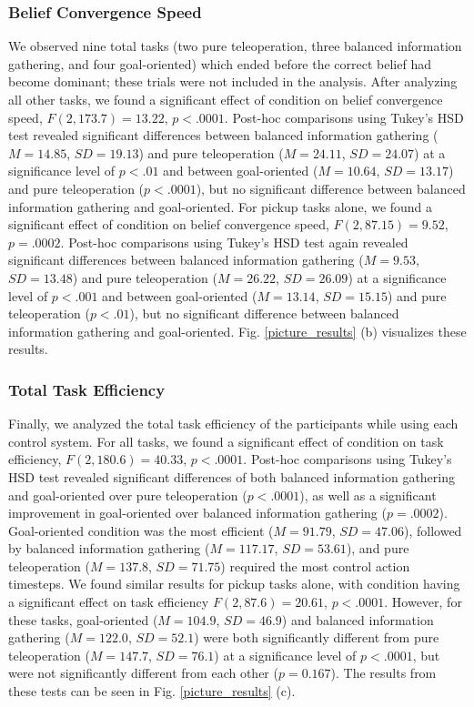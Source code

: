 \documentclass[conference]{IEEEtran}
\begin{document}
\subsubsection{Belief Convergence Speed}

We observed nine total tasks (two pure teleoperation, three balanced information gathering, and four goal-oriented) which ended before the correct belief had become dominant; these trials were not included in the analysis.
After analyzing all other tasks, we found a significant effect of condition on belief convergence speed, $F(2, 173.7) = 13.22$, $p < .0001$. Post-hoc comparisons using Tukey's HSD test revealed significant differences between balanced information gathering ($M = 14.85$, $SD = 19.13$) and pure teleoperation ($M = 24.11$, $SD = 24.07$) at a significance level of $p < .01$ and between goal-oriented ($M = 10.64$, $SD = 13.17$) and pure teleoperation ($p < .0001$), but no significant difference between balanced information gathering and goal-oriented. For pickup tasks alone, we found a significant effect of condition on belief convergence speed, $F(2, 87.15) = 9.52$, $p = .0002$. Post-hoc comparisons using Tukey's HSD test again revealed significant differences between balanced information gathering ($M = 9.53$, $SD = 13.48$) and pure teleoperation ($M = 26.22$, $SD = 26.09$) at a significance level of $p < .001$ and between goal-oriented ($M = 13.14$, $SD = 15.15$) and pure teleoperation ($p < .01$), but no significant difference between balanced information gathering and goal-oriented. Fig. \ref{picture_results} (b) visualizes these results.

\subsubsection{Total Task Efficiency}

Finally, we analyzed the total task efficiency of the participants while using each control system.
For all tasks, we found a significant effect of condition on task efficiency, $F(2, 180.6) = 40.33$, $p < .0001$. Post-hoc comparisons using Tukey's HSD test revealed significant differences of both balanced information gathering and goal-oriented over pure teleoperation ($p < .0001$), as well as a significant improvement in goal-oriented over balanced information gathering ($p = .0002$). Goal-oriented condition was the most efficient ($M = 91.79$, $SD = 47.06$), followed by balanced information gathering ($M = 117.17$, $SD = 53.61$), and pure teleoperation ($M = 137.8$, $SD = 71.75$) required the most control action timesteps. We found similar results for pickup tasks alone, with condition having a significant effect on task efficiency $F(2, 87.6) = 20.61$, $p < .0001$. However, for these tasks, goal-oriented ($M = 104.9$, $SD = 46.9$) and balanced information gathering ($M = 122.0$, $SD = 52.1$) were both significantly different from pure teleoperation ($M = 147.7$, $SD = 76.1$) at a significance level of $p < .0001$, but were not significantly different from each other ($p = 0.167$). The results from these tests can be seen in Fig. \ref{picture_results} (c).
\end{document}

